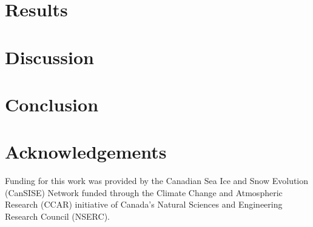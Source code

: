 \documentclass[12pt]{article}
\begin{document}
% 


\section{Results}



\section{Discussion}



\section{Conclusion}



\section{Acknowledgements}
Funding for this work was provided by the Canadian Sea Ice and Snow Evolution (CanSISE) Network funded through the Climate Change and Atmospheric Research (CCAR) initiative of Canada's Natural Sciences and Engineering Research Council (NSERC).  




\end{document}
